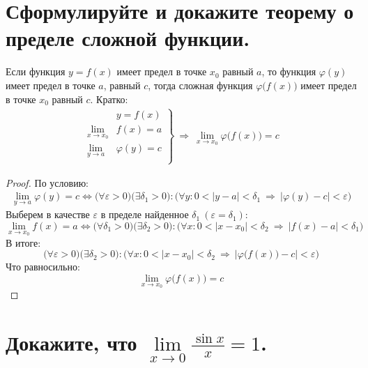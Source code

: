 \section{Сформулируйте и докажите теорему о пределе сложной функции.}

\begin{theorem}
  Если функция $y = f(x)$ имеет предел в точке  $x_0$ равный $a$, то функция  $\varphi(y)$ имеет предел в точке $a$, равный $c$, тогда сложная функция  $\varphi\big(f(x)\big)$ имеет предел в точке $x_0$ равный $c$. Кратко: \vspace{-\topsep}
  \begin{gather*}
    \left. \begin{aligned}
      &y = f(x) \\
      \lim\limits_{x \to x_0} &f(x) = a \\
      \lim\limits_{y \to a}\ &\varphi(y) = c \\
    \end{aligned}\right\}\ \Rightarrow\ \lim\limits_{x \to x_0} \varphi\big(f(x)\big) = c
  \end{gather*}
\end{theorem}
\begin{proof}
  По условию: \vspace{-4pt}
  \begin{gather*}
    \lim_{y \to a} \varphi(y) = c \iff \big(\forall \varepsilon > 0\big)\big(\exists \delta_1 > 0\big)\colon \big(\forall y\colon 0 < |y-a| < \delta_1\ \Rightarrow\ |\varphi(y) - c| < \varepsilon\big) \tag{1}
  \end{gather*}
  Выберем в качестве $\varepsilon$ в пределе найденное $\delta_1\ (\varepsilon = \delta_1)$: \[
    \lim_{x \to x_0} f(x) = a \iff \big(\forall \delta_1 > 0\big) \big(\exists \delta_2 > 0\big)\colon \big(\forall x\colon 0 < |x - x_0| < \delta_2\ \Rightarrow\ |f(x) - a| < \delta_1\big) \tag{2} 
  \]
  В итоге: \vspace{-\topsep} \[
  \big(\forall \varepsilon > 0\big)\big(\exists \delta_2 > 0\big)\colon \big(\forall x\colon 0 < |x - x_0| < \delta_2\ \Rightarrow\ \left|\varphi\big(f(x)\big) - c\right| < \varepsilon\big)
  \] 
  Что равносильно: \vspace{-0.8\topsep} \[
  \lim\limits_{x \to x_0} \varphi\big(f(x)\big) = c
  \] 
\end{proof}

\section{Докажите, что $\lim\limits_{x \to 0}\frac{\sin x}{x} = 1$.}


